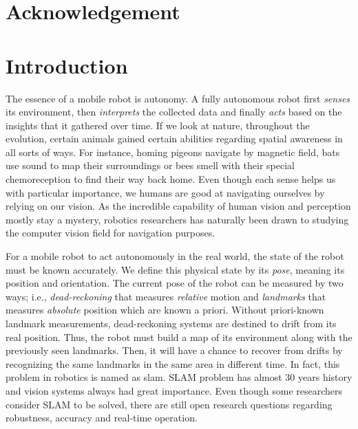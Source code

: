 \documentclass[a4paper]{report}
\numberwithin{figure}{section}
\begin{document}
\newpage



\tableofcontents
\cleardoublepage
\setcounter{page}{1}
\listoffigures
{}
\listoftables
{}
\newpage
\printnoidxglossary[type=acronym,title={List of Abbreviations}]
\printnoidxglossary[title=List of Notations,sort=def]
\glsaddallunused
\printacronyms
\chapter*{Acknowledgement}
\newpage


\chapter{Introduction} \label{cp_intro}

The essence of a mobile robot is autonomy. 
A fully autonomous robot first \textit{senses} its environment, then 
\textit{interprets} the collected data and finally \textit{acts} based on the insights 
that it gathered over time.
If we look at nature, throughout the evolution, 
certain animals gained certain abilities regarding 
spatial awareness in all sorts of ways. For instance, 
homing pigeons navigate by magnetic field, bats use sound to map their 
surroundings or bees smell with their special chemoreception to find their way 
back home. 
Even though each sense helps us with particular importance,
we humans are good at navigating ourselves by relying on our vision. 
As the incredible capability of human vision and perception 
mostly stay a mystery, 
robotics researchers has naturally been drawn to studying 
the computer vision field for navigation purposes.


For a mobile robot to act autonomously in the real world, the state of the
robot must be known accurately. We define this physical state by its
\textit{pose}, meaning its position and orientation. The current pose of the
robot can be measured by two ways; i.e., \textit{dead-reckoning} that measures
\textit{relative} motion and \textit{landmarks} that measures \textit{absolute}
position which are known a priori.  Without priori-known landmark measurements,
dead-reckoning systems are destined to drift from its real position. Thus, the
robot must build a map of its environment along with the previously seen
landmarks. Then, it will have a chance to recover from drifts by recognizing
the same landmarks in the same area in different time. In fact, this problem in
robotics is named as \acrfull{slam}.  SLAM problem has almost 30 years history
\parencite{Moravec1980} and vision systems always had great importance. Even 
though
some researchers \parencite{Frese2010} consider SLAM to be solved, there are 
still
open research questions regarding robustness, accuracy and real-time operation.
\end{document}
